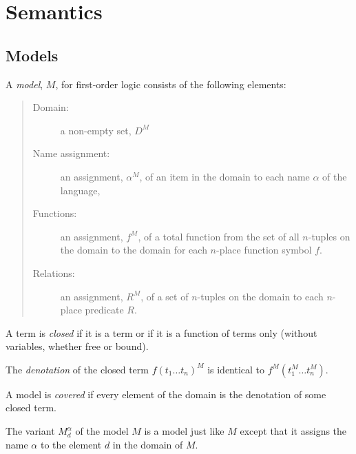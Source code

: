 \documentclass[syntax-and-semantics]{subfiles}
\begin{document}

\section{Semantics}

\subsection{Models}

\begin{defn}[Model]
A \emph{model}, $M$, for first-order logic consists of the following elements:
\begin{quote}
\begin{description}
\item[Domain:] a non-empty set, $D^M$ 
\item[Name assignment:] an assignment, $\alpha^M$, of an item in the domain to each name $\alpha$ of the language, 
\item[Functions:] an assignment, $f^M$, of a total function from the set of all $n$-tuples on the domain to the domain for each $n$-place function symbol $f$.
\item[Relations:] an assignment, $R^M$, of a set of $n$-tuples on the domain to each $n$-place predicate $R$.
\end{description}
\end{quote}
\end{defn}

\begin{defn}
A term is \emph{closed} if it is a term or if it is a function of terms only (without variables, whether free or bound).
\end{defn}

\begin{defn}
The \emph{denotation} of the closed term $f(t_1 \ldots t_n)^M$ is identical to $f^M(t_1^M \ldots t_n^M)$. 
\end{defn}

\begin{defn}
A model is \emph{covered} if every element of the domain is the denotation of some closed term. 
\end{defn}

\begin{defn}
The variant $M^\alpha_d$ of the model $M$ is a model just like $M$ except that it assigns the name $\alpha$ to the element $d$ in the domain of $M$.
\end{defn}
\end{document}
